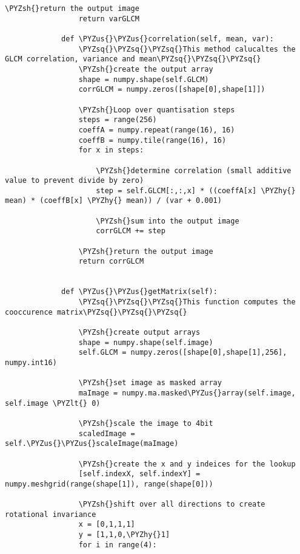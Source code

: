 \documentclass[11pt]{article}
\def\PYZsq{\textquotesingle}%
\def\PYZus{\char`\_}
\def\PYZlt{\char`\<}
\def\PYZsh{\char`\#}
\def\PYZhy{\char`\-}
\def\PYZsq{\char`\'}
\begin{document}
\begin{Verbatim}[commandchars=\\\{\}]
                 \PYZsh{}return the output image  
                 return varGLCM
                            
             def \PYZus{}\PYZus{}correlation(self, mean, var):
                 \PYZsq{}\PYZsq{}\PYZsq{}This method calucaltes the GLCM correlation, variance and mean\PYZsq{}\PYZsq{}\PYZsq{}
                 \PYZsh{}create the output array
                 shape = numpy.shape(self.GLCM)
                 corrGLCM = numpy.zeros([shape[0],shape[1]])
                 
                 \PYZsh{}Loop over quantisation steps
                 steps = range(256)
                 coeffA = numpy.repeat(range(16), 16)
                 coeffB = numpy.tile(range(16), 16) 
                 for x in steps:
                     
                     \PYZsh{}determine correlation (small additive value to prevent divide by zero)
                     step = self.GLCM[:,:,x] * ((coeffA[x] \PYZhy{} mean) * (coeffB[x] \PYZhy{} mean)) / (var + 0.001)  
                     
                     \PYZsh{}sum into the output image
                     corrGLCM += step
                     
                 \PYZsh{}return the output image  
                 return corrGLCM
                 
               
             def \PYZus{}\PYZus{}getMatrix(self):
                 \PYZsq{}\PYZsq{}\PYZsq{}This function computes the cooccurence matrix\PYZsq{}\PYZsq{}\PYZsq{}
                
                 \PYZsh{}create output arrays
                 shape = numpy.shape(self.image)
                 self.GLCM = numpy.zeros([shape[0],shape[1],256], numpy.int16)
                 
                 \PYZsh{}set image as masked array
                 maImage = numpy.ma.masked\PYZus{}array(self.image, self.image \PYZlt{} 0)
                 
                 \PYZsh{}scale the image to 4bit
                 scaledImage = self.\PYZus{}\PYZus{}scaleImage(maImage)
                
                 \PYZsh{}create the x and y indeices for the lookup
                 [self.indexX, self.indexY] = numpy.meshgrid(range(shape[1]), range(shape[0]))
                
                 \PYZsh{}shift over all directions to create rotational invariance
                 x = [0,1,1,1]
                 y = [1,1,0,\PYZhy{}1]
                 for i in range(4):
                    

\end{Verbatim}
\end{document}
